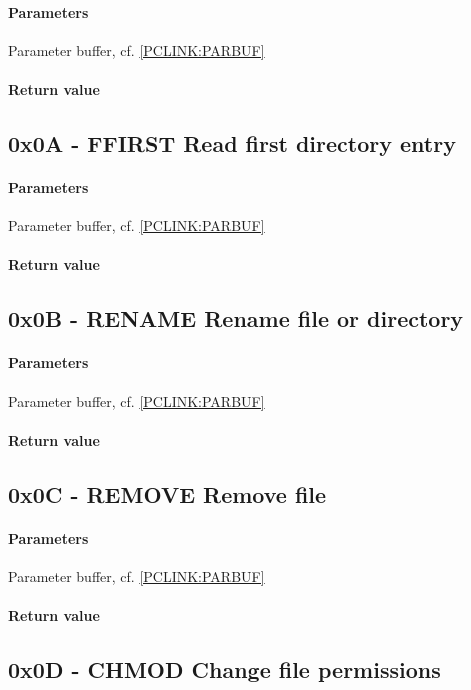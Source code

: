 \documentclass[10pt]{article}
\begin{document}
\paragraph{Parameters}
Parameter buffer, cf. \ref{PCLINK:PARBUF}

\paragraph{Return value}

\subsection{0x0A - FFIRST Read first directory entry }
\paragraph{Parameters}
Parameter buffer, cf. \ref{PCLINK:PARBUF}

\paragraph{Return value}

\subsection{0x0B - RENAME Rename file or directory }
\paragraph{Parameters}
Parameter buffer, cf. \ref{PCLINK:PARBUF}

\paragraph{Return value}

\subsection{0x0C - REMOVE Remove file }
\paragraph{Parameters}
Parameter buffer, cf. \ref{PCLINK:PARBUF}

\paragraph{Return value}

\subsection{0x0D - CHMOD Change file permissions }
\end{document}
